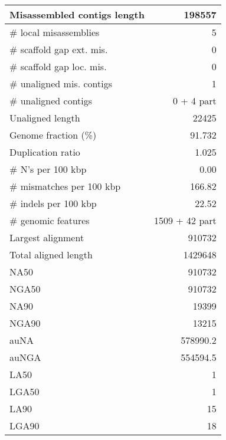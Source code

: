 \documentclass[12pt,a4paper]{article}
\begin{document}
\begin{table}[ht]
\begin{center}
\begin{tabular}{|l*{1}{|r}|}
Misassembled contigs length & 198557 \\ \hline
\# local misassemblies & 5 \\ \hline
\# scaffold gap ext. mis. & 0 \\ \hline
\# scaffold gap loc. mis. & 0 \\ \hline
\# unaligned mis. contigs & 1 \\ \hline
\# unaligned contigs & 0 + 4 part \\ \hline
Unaligned length & 22425 \\ \hline
Genome fraction (\%) & 91.732 \\ \hline
Duplication ratio & 1.025 \\ \hline
\# N's per 100 kbp & 0.00 \\ \hline
\# mismatches per 100 kbp & 166.82 \\ \hline
\# indels per 100 kbp & 22.52 \\ \hline
\# genomic features & 1509 + 42 part \\ \hline
Largest alignment & 910732 \\ \hline
Total aligned length & 1429648 \\ \hline
NA50 & 910732 \\ \hline
NGA50 & 910732 \\ \hline
NA90 & 19399 \\ \hline
NGA90 & 13215 \\ \hline
auNA & 578990.2 \\ \hline
auNGA & 554594.5 \\ \hline
LA50 & 1 \\ \hline
LGA50 & 1 \\ \hline
LA90 & 15 \\ \hline
LGA90 & 18 \\ \hline
\end{tabular}
\end{center}
\end{table}
\end{document}
